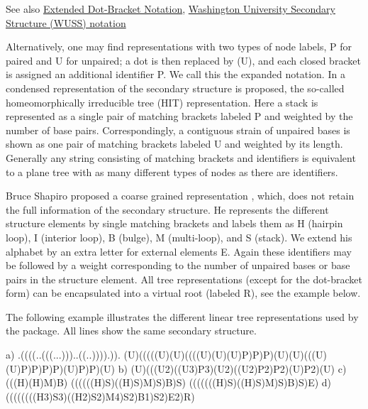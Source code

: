 \begin{DoxySeeAlso}{See also}
\hyperlink{rna_structure_notations_dot-bracket-ext-notation}{Extended Dot-\/\+Bracket Notation}, \hyperlink{rna_structure_notations_wuss-notation}{Washington University Secondary Structure (W\+U\+SS) notation}
\end{DoxySeeAlso}
Alternatively, one may find representations with two types of node labels, \textquotesingle{}P\textquotesingle{} for paired and \textquotesingle{}U\textquotesingle{} for unpaired; a dot is then replaced by \textquotesingle{}(U)\textquotesingle{}, and each closed bracket is assigned an additional identifier \textquotesingle{}P\textquotesingle{}. We call this the expanded notation. In \cite{fontana:1993b} a condensed representation of the secondary structure is proposed, the so-\/called homeomorphically irreducible tree (H\+IT) representation. Here a stack is represented as a single pair of matching brackets labeled \textquotesingle{}P\textquotesingle{} and weighted by the number of base pairs. Correspondingly, a contiguous strain of unpaired bases is shown as one pair of matching brackets labeled \textquotesingle{}U\textquotesingle{} and weighted by its length. Generally any string consisting of matching brackets and identifiers is equivalent to a plane tree with as many different types of nodes as there are identifiers.

Bruce Shapiro proposed a coarse grained representation \cite{shapiro:1988}, which, does not retain the full information of the secondary structure. He represents the different structure elements by single matching brackets and labels them as \textquotesingle{}H\textquotesingle{} (hairpin loop), \textquotesingle{}I\textquotesingle{} (interior loop), \textquotesingle{}B\textquotesingle{} (bulge), \textquotesingle{}M\textquotesingle{} (multi-\/loop), and \textquotesingle{}S\textquotesingle{} (stack). We extend his alphabet by an extra letter for external elements \textquotesingle{}E\textquotesingle{}. Again these identifiers may be followed by a weight corresponding to the number of unpaired bases or base pairs in the structure element. All tree representations (except for the dot-\/bracket form) can be encapsulated into a virtual root (labeled \textquotesingle{}R\textquotesingle{}), see the example below.

The following example illustrates the different linear tree representations used by the package. All lines show the same secondary structure.

\begin{DoxyVerb}a) .((((..(((...)))..((..)))).)).
   (U)(((((U)(U)((((U)(U)(U)P)P)P)(U)(U)(((U)(U)P)P)P)P)(U)P)P)(U)
b) (U)(((U2)((U3)P3)(U2)((U2)P2)P2)(U)P2)(U)
c) (((H)(H)M)B)
   ((((((H)S)((H)S)M)S)B)S)
   (((((((H)S)((H)S)M)S)B)S)E)
d) ((((((((H3)S3)((H2)S2)M4)S2)B1)S2)E2)R)
\end{DoxyVerb}


